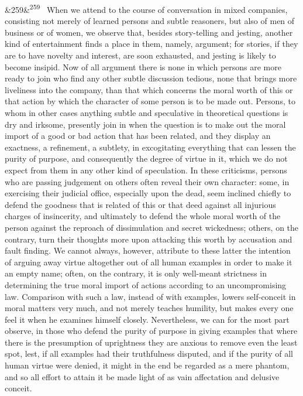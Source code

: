 \documentclass[12pt]{article}
\newcommand{\para}[1][]{\par\noindent\ifx&#1&\else\textsuperscript{\footnotesize #1}~\fi}
\begin{document}
\para[259] When we attend to the course of conversation in mixed companies, consisting not merely of learned persons and subtle reasoners, but also of men of business or of women, we observe that, besides story-telling and jesting, another kind of entertainment finds a place in them, namely, argument; for stories, if they are to have novelty and interest, are soon exhausted, and jesting is likely to become insipid. Now of all argument there is none in which persons are more ready to join who find any other subtle discussion tedious, none that brings more liveliness into the company, than that which concerns the moral worth of this or that action by which the character of some person is to be made out. Persons, to whom in other cases anything subtle and speculative in theoretical questions is dry and irksome, presently join in when the question is to make out the moral import of a good or bad action that has been related, and they display an exactness, a refinement, a subtlety, in excogitating everything that can lessen the purity of purpose, and consequently the degree of virtue in it, which we do not expect from them in any other kind of speculation. In these criticisms, persons who are passing judgement on others often reveal their own character: some, in exercising their judicial office, especially upon the dead, seem inclined chiefly to defend the goodness that is related of this or that deed against all injurious charges of insincerity, and ultimately to defend the whole moral worth of the person against the reproach of dissimulation and secret wickedness; others, on the contrary, turn their thoughts more upon attacking this worth by accusation and fault finding. We cannot always, however, attribute to these latter the intention of arguing away virtue altogether out of all human examples in order to make it an empty name; often, on the contrary, it is only well-meant strictness in determining the true moral import of actions according to an uncompromising law. Comparison with such a law, instead of with examples, lowers self-conceit in moral matters very much, and not merely teaches humility, but makes every one feel it when he examines himself closely. Nevertheless, we can for the most part observe, in those who defend the purity of purpose in giving examples that where there is the presumption of uprightness they are anxious to remove even the least spot, lest, if all examples had their truthfulness disputed, and if the purity of all human virtue were denied, it might in the end be regarded as a mere phantom, and so all effort to attain it be made light of as vain affectation and delusive conceit.
\end{document}

